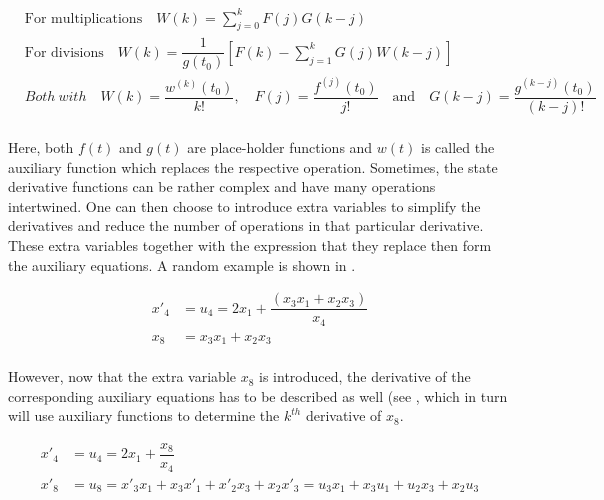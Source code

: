 \begin{equation} \label{eq:rec_rel}
\begin{split}
&\text{For multiplications} \quad W\left(k\right)=\displaystyle\sum_{j=0}^{k}F\left(j\right)G\left(k-j\right)\\
&\text{For divisions} \quad W\left(k\right)=\dfrac{1}{g\left(t_{0}\right)}\left[F\left(k\right)-\displaystyle\sum_{j=1}^{k} G\left(j\right)W\left(k-j\right)\right]\\
& Both \ with \quad W\left(k\right)=\dfrac{w^{\left(k\right)}\left(t_{0}\right)}{k!}, \quad F\left(j\right)=\dfrac{f^{\left(j\right)}\left(t_{0}\right)}{j!} \quad \text{and} \quad G\left(k-j\right)=\dfrac{g^{\left(k-j\right)}\left(t_{0}\right)}{\left(k-j\right)!}\\
\end{split}
\end{equation}

Here, both $f\left(t\right)$ and $g\left(t\right)$ are place-holder functions and $w\left(t\right)$ is called the auxiliary function which replaces the respective operation. Sometimes, the state derivative functions can be rather complex and have many operations intertwined. One can then choose to introduce extra variables to simplify the derivatives and reduce the number of operations in that particular derivative. These extra variables together with the expression that they replace then form the auxiliary equations. A random example is shown in .

\begin{equation} \label{eq:auxEqExample}
\begin{split}
x'_{4} &= u_{4} = 2x_{1}+\dfrac{\left(x_{3}x_{1}+x_{2}x_{3}\right)}{x_{4}} \\
x_{8} &= x_{3}x_{1}+x_{2}x_{3} \\
\end{split}
\end{equation}

However, now that the extra variable $x_{8}$ is introduced, the derivative of the corresponding auxiliary equations has to be described as well (see , which in turn will use auxiliary functions to determine the $k^{th}$ derivative of $x_{8}$.

\begin{equation} \label{eq:auxDerExample}
\begin{split}
x'_{4} &= u_{4} = 2x_{1}+\dfrac{x_{8}}{x_{4}} \\
x'_{8} &= u_{8} =  x'_{3}x_{1}+x_{3}x'_{1}+x'_{2}x_{3}+x_{2}x'_{3} = u_{3}x_{1}+x_{3}u_{1}+u_{2}x_{3}+x_{2}u_{3} \\
\end{split}
\end{equation}

